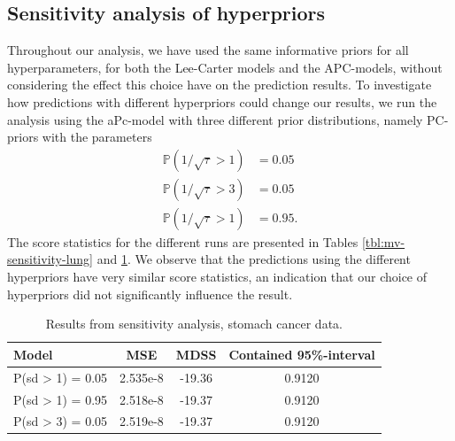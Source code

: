 \newpage
\subsection{Sensitivity analysis of hyperpriors}
Throughout our analysis, we have used the same informative priors for all hyperparameters, for both the Lee-Carter models and the APC-models, without considering the effect this choice have on the prediction results. To investigate how predictions with different hyperpriors could change our results, we run the analysis using the aPc-model with three different prior distributions, namely PC-priors with the parameters
\begin{equation}
    \begin{aligned}
        \mathbb{P}(1/\sqrt{\tau} > 1) & = 0.05 \\
        \mathbb{P}(1/\sqrt{\tau} > 3) & = 0.05 \\
        \mathbb{P}(1/\sqrt{\tau} > 1) & = 0.95.
    \end{aligned}
\end{equation}
The score statistics for the different runs are presented in Tables \ref{tbl:mv-sensitivity-lung} and \ref{tbl:mv-sensitivity-stomach}. We observe that the predictions using the different hyperpriors have very similar score statistics, an indication that our choice of hyperpriors did not significantly influence the result. 


\begin{table}
    \begin{center}
        \begin{tabular}{l |c c c }
        Model & MSE &   MDSS & Contained 95\%-interval\\
        \hline
        P(sd > 1) = 0.05 & 2.535e-8 & -19.36    & 0.9120\\
        P(sd > 1) = 0.95 & 2.518e-8 & -19.37    & 0.9120\\
        P(sd > 3) = 0.05 & 2.519e-8 & -19.37    & 0.9120\\
        \end{tabular}
    \caption{Results from sensitivity analysis, stomach cancer data.}\label{tbl:mv-sensitivity-stomach}
    \end{center}
\end{table}

